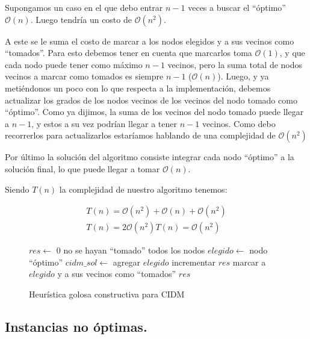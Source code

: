 Supongamos un caso en el que debo entrar $n-1$ veces a buscar el ``óptimo'' $\mathcal{O}(n)$. Luego tendría un costo de $\mathcal{O}(n^2)$.


A este se le suma el costo de marcar a los nodos elegidos y a sus vecinos como ``tomados''. Para esto debemos tener en cuenta que marcarlos toma $\mathcal{O}(1)$, y que cada nodo puede tener como máximo $n-1$ vecinos, pero la suma total de nodos vecinos a marcar como tomados es siempre $n-1$ ($\mathcal{O}(n)$). Luego, y ya metiéndonos un poco con lo que respecta a la implementación, debemos actualizar los grados de los nodos vecinos de los vecinos del nodo tomado como ``óptimo''. Como ya dijimos, la suma de los vecinos del nodo tomado puede llegar a $n-1$, y estos a su vez podrían llegar a tener $n-1$ vecinos. Como debo recorrerlos para actualizarlos estaríamos hablando de una complejidad de $\mathcal{O}(n^2)$


Por último la solución del algoritmo consiste integrar cada nodo ``óptimo'' a la solución final, lo que puede llegar a tomar $\mathcal{O}(n)$.

Siendo $T(n)$ la complejidad de nuestro algoritmo tenemos:

\begin{equation*}
\begin{array}{l}
T(n) = \mathcal{O}(n^2) + \mathcal{O}(n) + \mathcal{O}(n^2)\\
T(n) = 2\mathcal{O}(n^2)
T(n) = \mathcal{O}(n^2)
\end{array}
\end{equation*}

\begin{figure}
\begin{codebox}
\li $res \leftarrow$ 0
\li \While no se hayan ``tomado'' todos los nodos
\li 	\Do 
 		$elegido \leftarrow$ nodo ``óptimo''
\li 		$cidm\_sol \leftarrow$ agregar $elegido$
\li 		incrementar $res$
\li 		marcar a $elegido$ y a sus vecinos como ``tomados''
	\End
\li \Return $res$
\end{codebox}
\caption{Heurística golosa constructiva para CIDM}\label{code:goloso}
\end{figure}

\vspace*{0.6cm}

\subsection{Instancias no óptimas.}

